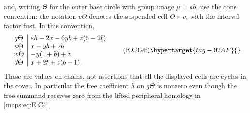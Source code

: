 \begin{theorem}
\[\]
and, writing $\Theta$ for the outer base circle with
group image $\mu=ab$, use the cone convention: the
notation $v\Theta$ denotes the suspended cell
$\Theta\times v$, with the interval factor first.
In this convention,
\[
 \begin{array}{c|l}
  g\Theta&eh-2x-6yb+z(5-2b)\\
  u\Theta&x-yb+zb\\
  w\Theta&-y(1+b)+z\\
  d\Theta&x+2t+z(b-1).
 \end{array}
 \tag{E.C19b}\hypertarget{tag-02AF}{}\label{maps:eq:E.C19b}
\]
These are values on chains, not assertions that all
the displayed cells are cycles in the cover. In
particular the free coefficient $h$ on $g\Theta$
is nonzero even though the free summand receives
zero from the lifted peripheral homology in \eqref{maps:eq:E.C4}.


\end{theorem}



